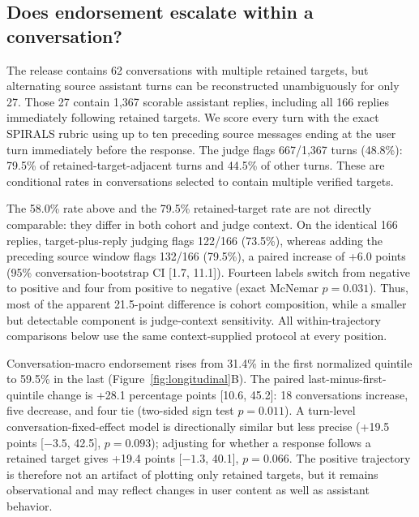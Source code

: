 \documentclass{article}
\begin{document}
\subsection{Does endorsement escalate within a conversation?}

The release contains 62 conversations with multiple retained targets, but alternating source assistant turns can be reconstructed unambiguously for only 27. Those 27 contain 1,367 scorable assistant replies, including all 166 replies immediately following retained targets. We score every turn with the exact SPIRALS rubric using up to ten preceding source messages ending at the user turn immediately before the response. The judge flags 667/1,367 turns (48.8\%): 79.5\% of retained-target-adjacent turns and 44.5\% of other turns. These are conditional rates in conversations selected to contain multiple verified targets.

The 58.0\% rate above and the 79.5\% retained-target rate are not directly comparable: they differ in both cohort and judge context. On the identical 166 replies, target-plus-reply judging flags 122/166 (73.5\%), whereas adding the preceding source window flags 132/166 (79.5\%), a paired increase of +6.0 points (95\% conversation-bootstrap CI [1.7, 11.1]). Fourteen labels switch from negative to positive and four from positive to negative (exact McNemar $p=0.031$). Thus, most of the apparent 21.5-point difference is cohort composition, while a smaller but detectable component is judge-context sensitivity. All within-trajectory comparisons below use the same context-supplied protocol at every position.

Conversation-macro endorsement rises from 31.4\% in the first normalized quintile to 59.5\% in the last (Figure~\ref{fig:longitudinal}B). The paired last-minus-first-quintile change is +28.1 percentage points [10.6, 45.2]: 18 conversations increase, five decrease, and four tie (two-sided sign test $p=0.011$). A turn-level conversation-fixed-effect model is directionally similar but less precise (+19.5 points [${-}3.5$, 42.5], $p=0.093$); adjusting for whether a response follows a retained target gives +19.4 points [${-}1.3$, 40.1], $p=0.066$. The positive trajectory is therefore not an artifact of plotting only retained targets, but it remains observational and may reflect changes in user content as well as assistant behavior.
\end{document}
